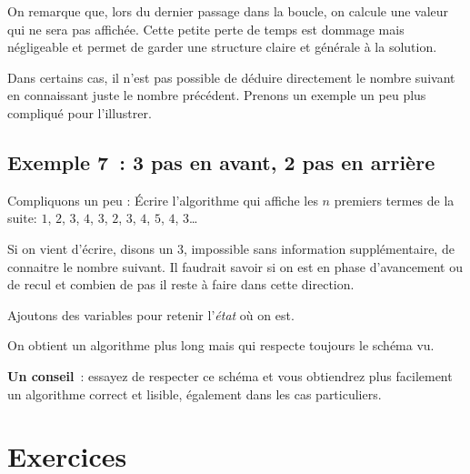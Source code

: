 On remarque que, lors du dernier passage dans la boucle,
on calcule une valeur qui ne sera pas affichée.
Cette petite perte de temps est dommage mais négligeable
et permet de garder une structure claire et générale à la solution.

Dans certains cas,
il n'est pas possible de déduire directement le nombre suivant
en connaissant juste le nombre précédent.
Prenons un exemple un peu plus compliqué pour l'illustrer.

\subsection{Exemple 7~: 3 pas en avant, 2 pas en arrière} 
	Compliquons un peu : 
	\og{}Écrire l'algorithme qui affiche les $n$ premiers termes
	de la suite: $1$, $2$, $3$, $4$, $3$, $2$, $3$, $4$, $5$, $4$, $3$\dots\fg{}

Si on vient d'écrire, disons un $3$,
impossible sans information supplémentaire,
de connaitre le nombre suivant.
Il faudrait savoir si on est en phase d'avancement ou de recul
et combien de pas il reste à faire dans cette direction.

Ajoutons des variables pour retenir l'\emph{état} où on est.


On obtient un algorithme plus long 
mais qui respecte toujours le schéma vu.

\textbf{Un conseil}~: essayez de respecter ce schéma 
et vous obtiendrez plus facilement un algorithme
correct et lisible, également dans les cas particuliers.
	
\section{Exercices}

